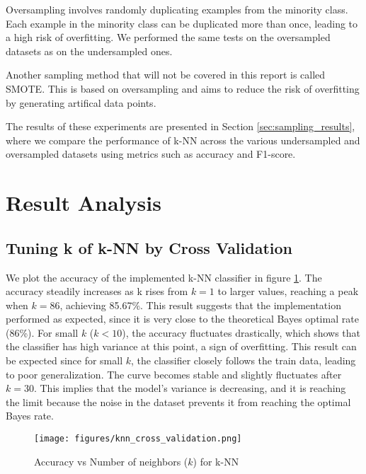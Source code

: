\documentclass{article}
\theoremstyle{plain}
\theoremstyle{definition}
\theoremstyle{remark}
\begin{document}
    Oversampling involves randomly duplicating examples from the minority class. Each example in the minority class can be duplicated more than once, leading to a high risk of overfitting. We performed the same tests on the oversampled datasets as on the undersampled ones.

    Another sampling method that will not be covered in this report is called SMOTE. This is based on oversampling and aims to reduce the risk of overfitting by generating artifical data points.

    The results of these experiments are presented in Section \ref{sec:sampling_results}, where we compare the performance of k-NN across the various undersampled and oversampled datasets using metrics such as accuracy and F1-score.


\section{Result Analysis}
\subsection{Tuning k of k-NN by Cross Validation}

We plot the accuracy of the implemented k-NN classifier in figure \ref{fig:knn_cross_validation}. The accuracy steadily increases as k rises from $k = 1$ to larger values, reaching a peak when $k = 86$, achieving 85.67\%. This result suggests that the implementation performed as expected, since it is very close to the theoretical Bayes optimal rate (86\%). For small $k$ ($k < 10$), the accuracy fluctuates drastically, which shows that the classifier has high variance at this point, a sign of overfitting. This result can be expected since for small $k$, the classifier closely follows the train data, leading to poor generalization. The curve becomes stable and slightly fluctuates after $k = 30$. This implies that the model's variance is decreasing, and it is reaching the limit because the noise in the dataset prevents it from reaching the optimal Bayes rate.

\begin{figure}[h]
    \centering
    \begin{minipage}[t]{0.8\linewidth}
        \centering
        \texttt{[image: figures/knn\_cross\_validation.png]}
        \caption{Accuracy vs Number of neighbors ($k$) for k-NN}
        \label{fig:knn_cross_validation}
    \end{minipage}%
\end{figure}
\end{document}
